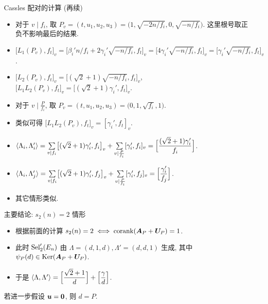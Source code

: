\documentclass[aspectratio=169,handout]{ctexbeamer}
\renewcommand\aleg[2]{\Bigl[\dfrac{{#1}}{#2}\Bigr]}
\begin{document}
\begin{frame}{Cassles 配对的计算 (再续)}  
  \begin{itemize}
    \item 对于 $v\mid f_i$, 取 $P_v=(t,u_1,u_2,u_3)=\bigl(1,\sqrt{-2n/f_i},0,\sqrt{-n/f_i}\bigr)$.
    这里根号取正负不影响最后的结果.
    \item $\bigl[L_1(P_v),f_t\bigr]_v
      =\bigl[\beta_i'n/f_i+2\gamma_i'\sqrt{-n/f_i},f_t\bigr]_v
      =\bigl[4\gamma_i'\sqrt{-n/f_i},f_t\bigr]_v
      =\bigl[\gamma_i'\sqrt{-n/f_i},f_t\bigr]_v$.
    \item $\bigl[L_2(P_v),f_t\bigr]_v
      =\bigl[(\sqrt2+1)\sqrt{-n/f_i},f_t\bigr]_v$,
      $\bigl[L_1L_2(P_v),f_t\bigr]_v
        =\bigl[(\sqrt2+1)\gamma_i',f_t\bigr]_v$.
    \item 对于 $v\mid \frac P{f_i}$, 取 $P_v=(t,u_1,u_2,u_3)=\bigl(0,1,\sqrt{f_i},1\bigr)$.
    \item 类似可得 $\bigl[L_1L_2(P_v),f_t\bigr]_v=[\gamma_i',f_t]_v$.
    \item $\pair{\Lambda_i,\Lambda_i'}
        =\suml_{v\mid f_i}\bigl[(\sqrt2+1)\gamma_i',f_i\bigr]_v
        +\suml_{v\mid \frac{P}{f_i}}[\gamma_i',f_i]_v
        =\aleg{(\sqrt2+1)\gamma_i'}{f_i}$.
    \item $\pair{\Lambda_i,\Lambda_j'}
        =\suml_{v\mid f_i}\bigl[(\sqrt2+1)\gamma_i',f_j\bigr]_v
        +\suml_{v\mid \frac{P}{f_i}}[\gamma_i',f_j]_v
        =\aleg{\gamma_i'}{f_j}$.
    \item 其它情形类似.
  \end{itemize}
\end{frame}


\begin{frame}{主要结论: $s_2(n)=2$ 情形}
  \begin{itemize}
    \item 根据前面的计算 $s_2(n)=2\iff \operatorname{corank}({\boldsymbol{A}}_P+{\boldsymbol{U}}_P)=1$.
    \item 此时 ${\mathrm{Sel}}_2'(E_n)$ 由 $\Lambda=(d,1,d),\Lambda'=(d,d,1)$ 生成, 其中 $\psi_P(d)\in\operatorname{Ker}({\boldsymbol{A}}_P+{\boldsymbol{U}}_P)$.
    \item 于是 $\pair{\Lambda,\Lambda'}
		=\aleg{\sqrt2+1}d+\aleg{\gamma}{d}$.
  \end{itemize}
  \onslide<+->
  若进一步假设 ${\boldsymbol{u}}={\bf0}$, 则 $d=P$.
\end{frame}
\end{document}
